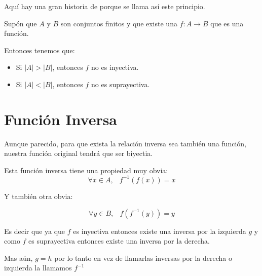 \documentclass[12pt, fleqn]{report}                             %
\DeclareMathOperator \Space {\quad}                             %
\DeclareMathOperator \MiniSpace {\;}                            %
\begin{document}
            Aquí hay una gran historia de porque se llama así este principio.

            Supón que $A$ y $B$ son conjuntos finitos y que existe una $f: A \to B$ que es una función.

            Entonces tenemos que:
            \begin{itemize}
                \item Si $|A| > |B|$, entonces $f$ no es inyectiva.
                \item Si $|A| < |B|$, entonces $f$ no es suprayectiva.
            \end{itemize}





        \section{Función Inversa}

            Aunque parecido, para que exista la relación inversa sea también una función,
            nuestra función original tendrá que ser biyectia.

            Esta función inversa tiene una propiedad muy obvia:
            \begin{equation*}
                \forall x \in A, \MiniSpace f^{-1}(f(x)) = x
            \end{equation*}

            Y también otra obvia:

            \begin{equation*}
                \forall y \in B, \MiniSpace f(f^{-1}(y)) = y
            \end{equation*}


            Es decir que ya que $f$ es inyectiva entonces existe una inversa por la
            izquierda $g$ y como $f$ es suprayectiva entonces existe una inversa por la
            derecha.

            Mas aún, $g = h$ por lo tanto en vez de llamarlas inversas por la derecha o izquierda
            la llamamos $f^{-1}$





        \clearpage
\end{document}
